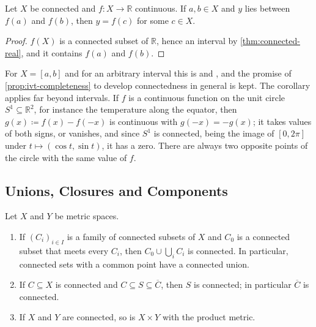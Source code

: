 \begin{corollary}
\label{cor:ivt-general}
Let $X$ be connected and $f\colon X\to\mathbb R$ continuous. If $a,b\in X$ and $y$ lies between $f(a)$ and $f(b)$, then $y=f(c)$ for some $c\in X$.
\end{corollary}

\begin{proof}
$f(X)$ is a connected subset of $\mathbb R$, hence an interval by \cref{thm:connected-real}, and it contains $f(a)$ and $f(b)$.
\end{proof}

For $X=[a,b]$ and for an arbitrary interval this is  and , and the promise of \cref{prop:ivt-completeness} to develop connectedness in general is kept. The corollary applies far beyond intervals. If $f$ is a continuous function on the unit circle $S^1\subseteq\mathbb R^2$, for instance the temperature along the equator, then $g(x)\coloneqq f(x)-f(-x)$ is continuous with $g(-x)=-g(x)$; it takes values of both signs, or vanishes, and since $S^1$ is connected, being the image of $[0,2\pi]$ under $t\mapsto(\cos t,\sin t)$, it has a zero. There are always two opposite points of the circle with the same value of $f$.

\subsection{Unions, Closures and Components}

\begin{proposition}
\label{prop:connected-unions}
Let $X$ and $Y$ be metric spaces.
\begin{enumerate}
\item If $(C_i)_{i\in I}$ is a family of connected subsets of $X$ and $C_0$ is a connected subset that meets every $C_i$, then $C_0\cup\bigcup_iC_i$ is connected. In particular, connected sets with a common point have a connected union.
\item If $C\subseteq X$ is connected and $C\subseteq S\subseteq\overline C$, then $S$ is connected; in particular $\overline C$ is connected.
\item If $X$ and $Y$ are connected, so is $X\times Y$ with the product metric.
\end{enumerate}
\end{proposition}

